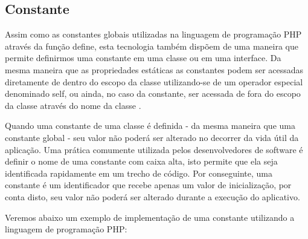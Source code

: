 \subsection{Constante}

Assim como as constantes globais utilizadas na linguagem de programação PHP
através da função define, esta tecnologia também dispõem de uma maneira que
permite definirmos uma constante em uma classe ou em uma interface. Da mesma
maneira que as propriedades estáticas as constantes podem ser acessadas
diretamente de dentro do escopo da classe utilizando-se de um operador especial
denominado self, ou ainda, no caso da constante, ser acessada de fora do escopo
da classe através do nome da classe  \cite{programmingPhp}.

Quando uma constante de uma classe é definida - da mesma maneira que uma
constante global -  seu valor não poderá ser alterado no decorrer da vida útil
da aplicação. Uma prática comumente utilizada pelos desenvolvedores de software
é definir o nome de uma constante com caixa alta, isto permite que ela seja
identificada rapidamente em um trecho de código. Por conseguinte, uma constante
é um identificador que recebe apenas um valor de inicialização, por conta disto,
seu valor não poderá ser alterado durante a execução do aplicativo.

Veremos abaixo um exemplo de implementação de uma constante utilizando a
linguagem de programação PHP: